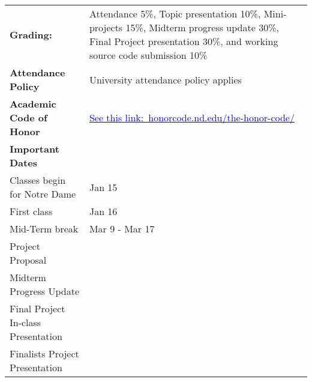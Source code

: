 \begin{center}
\begin{longtable}{ p{} p{} }
\midrule
\textbf{Grading: }&	Attendance 5\%, Topic presentation 10\%, Mini-projects 15\%,
				  	Midterm progress update 30\%, Final Project presentation 30\%,
					and working source code submission 10\%  \\
\textbf{Attendance Policy }& University attendance policy applies\\
\textbf{Academic Code of Honor} & \href{http://honorcode.nd.edu/the-honor-code/}{\textcolor{blue}{See this link:~\url{honorcode.nd.edu/the-honor-code/}}}\\
\midrule
\textbf{Important Dates }& \\
Classes begin for Notre Dame & Jan 15 \\
First class  & Jan 16 \\
Mid-Term break & Mar 9 - Mar 17 \\
Project Proposal & \\
Midterm Progress Update & \\
Final Project In-class Presentation & \\
Finalists Project Presentation & \\


\end{longtable}
\end{center}%